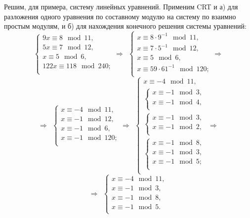 \example
Решим, для примера, систему линейных уравнений. Применим CRT и а) для разложения одного уравнения по составному модулю на систему по взаимно простым модулям, и б) для нахождения конечного решения системы уравнений:
\[
    \begin{cases}
        9 x \equiv 8 \mod 11, \\
        5 x \equiv 7 \mod 12, \\
        x \equiv 5 \mod 6, \\
        122 x \equiv 118 \mod 240; \\
    \end{cases}
    \Rightarrow ~~
    \begin{cases}
        x \equiv 8 \cdot 9^{-1} \mod 11, \\
        x \equiv 7 \cdot 5^{-1} \mod 12, \\
        x \equiv 5 \mod 6, \\
        x \equiv 59 \cdot 61^{-1} \mod 120; \\
    \end{cases}
    \Rightarrow
\] \[
    \Rightarrow ~~
    \begin{cases}
        x \equiv -4 \mod 11, \\
        x \equiv -1 \mod 12, \\
        x \equiv -1 \mod 6, \\
        x \equiv -1 \mod 120; \\
    \end{cases}
    \Rightarrow ~~
    \begin{cases}
        x \equiv -4 \mod 11, \\
        \begin{cases}
            x \equiv -1 \mod 3, \\
            x \equiv -1 \mod 4, \\
        \end{cases} \\
        \begin{cases}
            x \equiv -1 \mod 3, \\
            x \equiv -1 \mod 2, \\
        \end{cases} \\
        \begin{cases}
            x \equiv -1 \mod 8, \\
            x \equiv -1 \mod 3, \\
            x \equiv -1 \mod 5; \\
        \end{cases} \\
    \end{cases}
    \Rightarrow
\] \[
    \Rightarrow ~~
    \begin{cases}
        x \equiv -4 \mod 11, \\
        x \equiv -1 \mod 3, \\
        x \equiv -1 \mod 8, \\
        x \equiv -1 \mod 5. \\
    \end{cases}
\]
